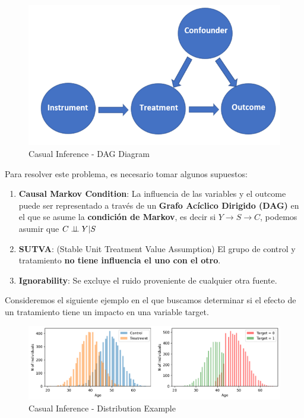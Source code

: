 \begin{figure}[H]
    \center
    \includegraphics[scale=0.3]{notebooks/STATS/img/causal_inference_diagram.png}
    \caption{Casual Inference - DAG Diagram}
\end{figure}

Para resolver este problema, es necesario tomar algunos supuestos: 
\begin{enumerate}
    \item \textbf{Causal Markov Condition}: La influencia de las variables y el outcome puede ser representado a través de un \textbf{Grafo Acíclico Dirigido (DAG)} en el que se asume la \textbf{condición de Markov}, es decir si $Y \rightarrow S \rightarrow C$, podemos asumir que $C \perp \!\!\! \perp Y | S$
    \item \textbf{SUTVA}: (Stable Unit Treatment Value Assumption) El grupo de control y tratamiento \textbf{no tiene influencia el uno con el otro}. 
    \item \textbf{Ignorability}: Se excluye el ruido proveniente de cualquier otra fuente. 
\end{enumerate}

Consideremos el siguiente ejemplo en el que buscamos determinar si el efecto de un tratamiento tiene un impacto en una variable target. 

\begin{figure}[H]
    \center
    \includegraphics[scale=0.5]{notebooks/STATS/img/causal_inference_age_distribution.png}
    \caption{Casual Inference - Distribution Example}
\end{figure}


